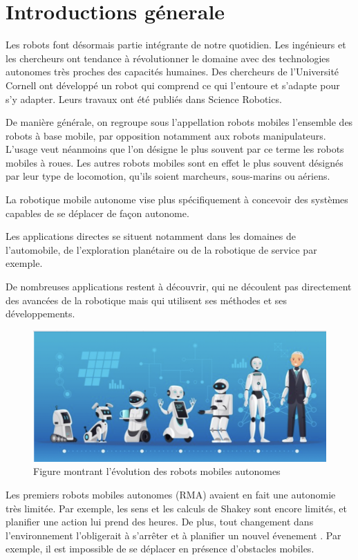 \newpage
\chapter{Introductions génerale}

Les robots font désormais partie intégrante de notre quotidien. Les ingénieurs et les chercheurs ont tendance à révolutionner le domaine avec des technologies autonomes très proches des capacités humaines. Des chercheurs de l'Université Cornell ont développé un robot qui comprend ce qui l'entoure et s'adapte pour s'y adapter. Leurs travaux ont été publiés dans Science Robotics.

De manière générale, on regroupe sous l'appellation robots mobiles l'ensemble des robots à base mobile, par opposition notamment aux robots manipulateurs. L'usage veut néanmoins que l'on désigne le plus souvent par ce terme les robots mobiles à roues. Les autres robots mobiles sont en effet le plus souvent désignés par leur type de locomotion, qu'ils soient marcheurs, sous-marins ou aériens.

La robotique mobile autonome vise plus spécifiquement à concevoir des systèmes capables de
se déplacer de façon autonome.

Les applications directes se situent notamment dans les domaines de l'automobile, de
l'exploration planétaire ou de la robotique de service par exemple.

De nombreuses applications restent à découvrir, qui ne découlent pas directement des
avancées de la robotique mais qui utilisent ses méthodes et ses développements.

\begin{figure}[h]
    \centering
    \includegraphics[width=14cm]{assets/Evolution_robots_autonomes.png}
    \caption{Figure montrant l'évolution des robots mobiles autonomes }
    \label{amr}
    \end{figure}

\newpage
Les premiers robots mobiles autonomes (RMA) avaient en fait une autonomie très limitée. Par exemple, les sens et les calculs de Shakey sont encore limités, et planifier une action lui prend des heures. De plus, tout changement dans l'environnement l'obligerait à s'arrêter et à planifier un nouvel évenement . Par exemple, il est impossible de se déplacer en présence d'obstacles mobiles.  

